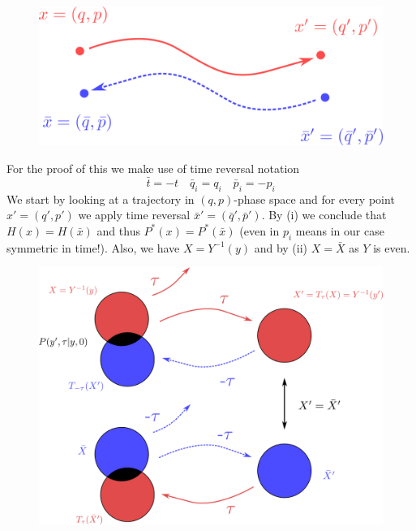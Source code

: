 \documentclass{/home/ben/Templates/notebook}
\begin{document}
	\begin{figure}[H]
		\centering
		\includegraphics[width=0.7\linewidth]{Pics/timereversal}
		\label{fig:timereversal}
	\end{figure}
	For the proof of this we make use of time reversal notation
	\begin{equation}
	\bar{t} = -t \quad \bar{q}_i = q_i \quad \bar{p}_i = -p_i
	\end{equation}
	We start by looking at a trajectory in $(q,p)$-phase space and for every point $x' = (q', p')$ we apply time reversal $\bar{x}' = (\bar{q}', \bar{p}')$. By (i) we conclude that $H(x) = H(\bar{x})$ and thus $P^*(x) = P^*(\bar{x})$ (even in $p_i$ means in our case symmetric in time!). Also, we have $X = Y^{-1}(y)$ and by (ii) $X = \bar{X}$ as $Y$ is even. 
	
	\begin{figure}[H]
		\centering
		\includegraphics[width=0.9\linewidth]{Pics/detailedbalance}
		\label{fig:detailedbalance}
	\end{figure}
	
\end{document}
